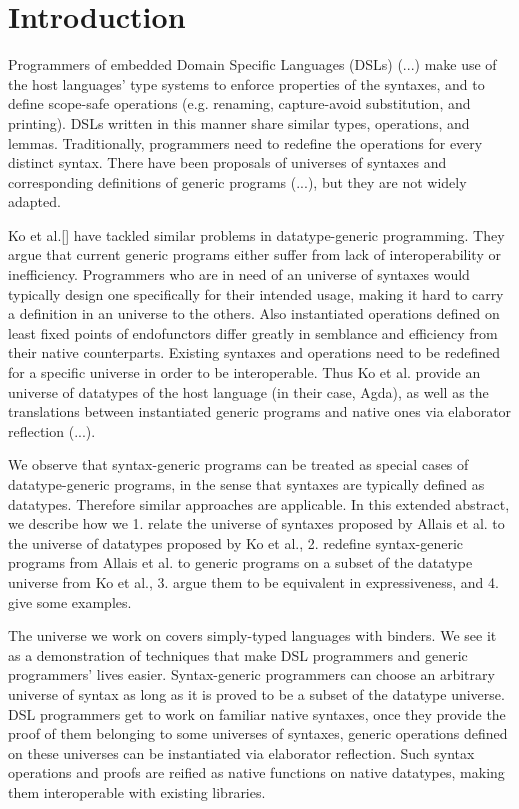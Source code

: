\documentclass[sigplan,review,fleqn]{acmart}
\begin{document}
\maketitle


\section{Introduction}
\label{sec:introduction}
Programmers of embedded Domain Specific Languages (DSLs) (...) make use of the host languages' type systems to enforce properties of the syntaxes, and to define scope-safe operations (e.g. renaming, capture-avoid substitution, and printing).
DSLs written in this manner share similar types, operations, and lemmas.
Traditionally, programmers need to redefine the operations for every distinct syntax.
There have been proposals of universes of syntaxes and corresponding definitions of generic programs (...), but they are not widely adapted.

Ko et al.[] have tackled similar problems in datatype-generic programming.
They argue that current generic programs either suffer from lack of interoperability or inefficiency.
Programmers who are in need of an universe of syntaxes would typically design one specifically for their intended usage, making it hard to carry a definition in an universe to the others.
Also instantiated operations defined on least fixed points of endofunctors differ greatly in semblance and efficiency from their native counterparts.
Existing syntaxes and operations need to be redefined for a specific universe in order to be interoperable.
Thus Ko et al. provide an universe of datatypes of the host language (in their case, Agda), as well as the translations between instantiated generic programs and native ones via elaborator reflection (...).

We observe that syntax-generic programs can be treated as special cases of datatype-generic programs, in the sense that syntaxes are typically defined as datatypes.
Therefore similar approaches are applicable.
In this extended abstract, we describe how we
1. relate the universe of syntaxes proposed by Allais et al. to the universe of datatypes proposed by Ko et al.,
2. redefine syntax-generic programs from Allais et al. to generic programs on a subset of the datatype universe from Ko et al.,
3. argue them to be equivalent in expressiveness, and
4. give some examples.

The universe we work on covers simply-typed languages with binders. 
We see it as a demonstration of techniques that make DSL programmers and generic programmers' lives easier.
Syntax-generic programmers can choose an arbitrary universe of syntax as long as it is proved to be a subset of the datatype universe.
DSL programmers get to work on familiar native syntaxes, once they provide the proof of them belonging to some universes of syntaxes, generic operations defined on these universes can be instantiated via elaborator reflection.
Such syntax operations and proofs are reified as native functions on native datatypes, making them interoperable with existing libraries.
\end{document}
